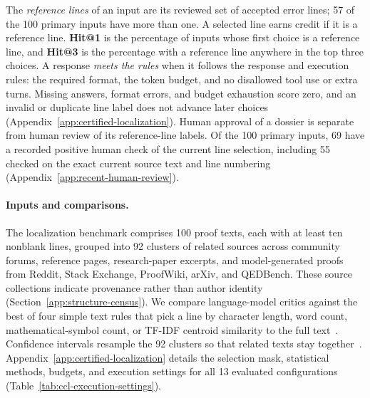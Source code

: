 The \emph{reference lines} of an input are its reviewed set of accepted error lines; 57 of the 100 primary inputs have more than one. A selected line earns credit if it is a reference line. \textbf{Hit@1} is the percentage of inputs whose first choice is a reference line, and \textbf{Hit@3} is the percentage with a reference line anywhere in the top three choices. A response \emph{meets the rules} when it follows the response and execution rules: the required format, the token budget, and no disallowed tool use or extra turns. Missing answers, format errors, and budget exhaustion score zero, and an invalid or duplicate line label does not advance later choices (Appendix~\ref{app:certified-localization}). Human approval of a dossier is separate from human review of its reference-line labels. Of the 100 primary inputs, 69 have a recorded positive human check of the current line selection, including 55 checked on the exact current source text and line numbering (Appendix~\ref{app:recent-human-review}).

\paragraph{Inputs and comparisons.}
The localization benchmark comprises 100 proof texts, each with at least ten nonblank lines, grouped into 92 clusters of related sources across community forums, reference pages, research-paper excerpts, and model-generated proofs from Reddit, Stack Exchange, ProofWiki, arXiv, and QEDBench. These source collections indicate provenance rather than author identity (Section~\ref{app:structure-census}). We compare language-model critics against the best of four simple text rules that pick a line by character length, word count, mathematical-symbol count, or TF-IDF centroid similarity to the full text~\citep{salton1988termweighting}. Confidence intervals resample the 92 clusters so that related texts stay together~\citep{efron1979bootstrap,field2007clustered}. Appendix~\ref{app:certified-localization} details the selection mask, statistical methods, budgets, and execution settings for all 13 evaluated configurations (Table~\ref{tab:ccl-execution-settings}).




